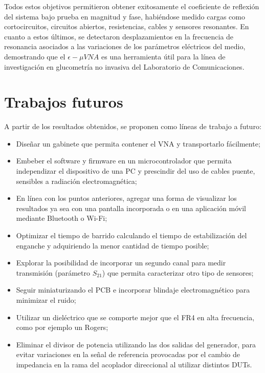 Todos estos objetivos permitieron obtener exitosamente el coeficiente de reflexión del sistema bajo prueba en magnitud y fase, habiéndose medido cargas como cortocircuitos, circuitos abiertos, resistencias, cables y sensores resonantes. En cuanto a estos últimos, se detectaron desplazamientos en la frecuencia de resonancia asociados a las variaciones de los parámetros eléctricos del medio, demostrando que el $\epsilon-\mu VNA$ es una herramienta útil para la línea de investigación en glucometría no invasiva del Laboratorio de Comunicaciones. 

\section{Trabajos futuros}
A partir de los resultados obtenidos, se proponen como líneas de trabajo a futuro:

\begin{itemize}
    \item Diseñar un gabinete que permita contener el VNA y transportarlo fácilmente;
    \item Embeber el software y firmware en un microcontrolador que permita independizar el dispositivo de una PC y prescindir del uso de cables puente, sensibles a radiación electromagnética; 
    \item En línea con los puntos anteriores, agregar una forma de visualizar los resultados ya sea con una pantalla incorporada o en una aplicación móvil mediante Bluetooth o Wi-Fi;
    \item Optimizar el tiempo de barrido calculando el tiempo de estabilización del enganche y adquiriendo la menor cantidad de tiempo posible;
    \item Explorar la posibilidad de incorporar un segundo canal para medir transmisión (parámetro $S_{21}$) que permita caracterizar otro tipo de sensores;
    \item Seguir miniaturizando el PCB e incorporar blindaje electromagnético para minimizar el ruido;
    \item Utilizar un dieléctrico que se comporte mejor que el FR4 en alta frecuencia, como por ejemplo un Rogers;
    \item Eliminar el divisor de potencia utilizando las dos salidas del generador, para evitar variaciones en la señal de referencia provocadas por el cambio de impedancia en la rama del acoplador direccional al utilizar distintos DUTs.  
\end{itemize}